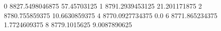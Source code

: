 0 8827.5498046875 57.45703125
1 8791.2939453125 21.201171875
2 8780.755859375 10.6630859375
4 8770.0927734375 0.0
6 8771.865234375 1.7724609375
8 8779.1015625 9.0087890625
